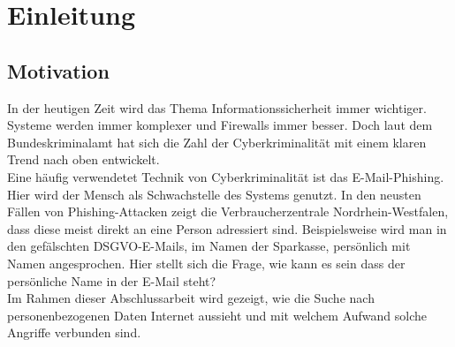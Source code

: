 \chapter{Einleitung}
\label{cha:einleitung}


\section{Motivation}
\label {sec:Motivation}
In der heutigen Zeit wird das Thema Informationssicherheit immer wichtiger. Systeme werden immer komplexer und Firewalls immer besser.
Doch laut dem Bundeskriminalamt hat sich die Zahl der Cyberkriminalität mit einem klaren Trend nach oben entwickelt. \cite{Cyberkriminalitaet}\\
Eine häufig verwendetet Technik von Cyberkriminalität ist das E-Mail-Phishing. Hier wird der Mensch als Schwachstelle des Systems genutzt. In den neusten Fällen von Phishing-Attacken zeigt die Verbraucherzentrale Nordrhein-Westfalen, dass diese meist direkt an eine Person adressiert sind. Beispielsweise wird man in den gefälschten DSGVO-E-Mails, im Namen der Sparkasse, persönlich mit Namen angesprochen. \cite{VerbraucherzentraleNW} Hier stellt sich die Frage, wie kann es sein dass der persönliche Name in der E-Mail steht?\\
Im Rahmen dieser Abschlussarbeit wird gezeigt, wie die Suche nach personenbezogenen Daten Internet aussieht und mit welchem Aufwand solche Angriffe verbunden sind.

